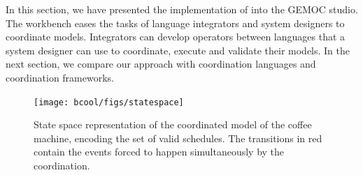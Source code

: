 In this section, we have presented the implementation of \bcool into the GEMOC studio. The workbench eases the tasks of language integrators and system designers to coordinate models. Integrators can develop operators between languages that a system designer can use to coordinate, execute and validate their models. In the next section, we compare our approach with coordination languages and coordination frameworks.  

\begin{figure}[]
	\begin{center}
		\texttt{[image: bcool/figs/statespace]}
		\caption{State space representation of the coordinated model of the coffee machine, encoding the set of valid schedules. The transitions in red contain the events forced to happen simultaneously by the coordination.}
		\label{fig:statespace}
	\end{center}
\end{figure}

	

	

